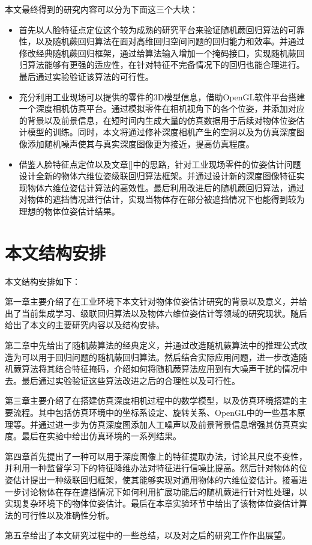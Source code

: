 本文最终得到的研究内容可以分为下面这三个大块：
\begin{itemize}
\item 首先以人脸特征点定位这个较为成熟的研究平台来验证随机蕨回归算法的可靠性，以及随机蕨回归算法在面对高维回归空间问题的回归能力和效率。并通过修改经典随机蕨回归框架，通过给算法输入增加一个掩码接口，实现随机蕨回归算法能够有更强的适应性，在针对特征不完备情况下的回归也能合理进行。最后通过实验验证该算法的可行性。
\item 充分利用工业现场可以提供的零件的3D模型信息，借助OpenGL软件平台搭建一个深度相机仿真平台。通过模拟零件在相机视角下的各个位姿，并添加对应的背景以及前景信息，在短时间内生成大量的仿真数据用于后续对物体位姿估计模型的训练。同时，本文将通过修补深度相机产生的空洞以及为仿真深度图像添加随机噪声使其与真实深度图像更为接近，提高仿真程度。
\item 借鉴人脸特征点定位以及文章[]中的思路，针对工业现场零件的位姿估计问题设计全新的物体六维位姿级联回归算法框架。并通过设计新的深度图像特征实现物体六维位姿估计算法的高效性。最后利用改进后的随机蕨回归算法，通过对物体的遮挡情况进行估计，实现当物体存在部分被遮挡情况下也能得到较为理想的物体位姿估计结果。
\end{itemize}


\section{本文结构安排}

本文结构安排如下：

第一章主要介绍了在工业环境下本文针对物体位姿估计研究的背景以及意义，并给出了当前集成学习、级联回归算法以及物体六维位姿估计等领域的研究现状。随后给出了本文的主要研究内容以及结构安排。

第二章中先给出了随机蕨算法的经典定义，并通过改造随机蕨算法中的推理公式改造为可以用于回归问题的随机蕨回归算法。然后结合实际应用问题，进一步改造随机蕨算法将其结合特征掩码，介绍如何将随机蕨算法应用到有大噪声干扰的情况中去。最后通过实验验证这些算法改进之后的合理性以及可行性。

第三章主要介绍了在搭建仿真深度相机过程中的数学模型，以及仿真环境搭建的主要流程。其中包括仿真环境中的坐标系设定、旋转关系、OpenGL中的一些基本原理等。并通过进一步为仿真深度图添加人工噪声以及前景背景信息增强其仿真真实度。最后在实验中给出仿真环境的一系列结果。

第四章首先提出了一种可以用于深度图像上的特征提取办法，讨论其尺度不变性，并利用一种监督学习下的特征降维办法对特征进行信噪比提高。然后针对物体的位姿估计提出一种级联回归框架，使其能够实现对通用物体的六维位姿估计。接着进一步讨论物体在存在遮挡情况下如何利用扩展功能后的随机蕨进行针对性处理，以实现复杂环境下的物体位姿估计。最后在本章实验环节中给出了该物体位姿估计算法的可行性以及准确性分析。

第五章给出了本文研究过程中的一些总结，以及对之后的研究工作作出展望。














